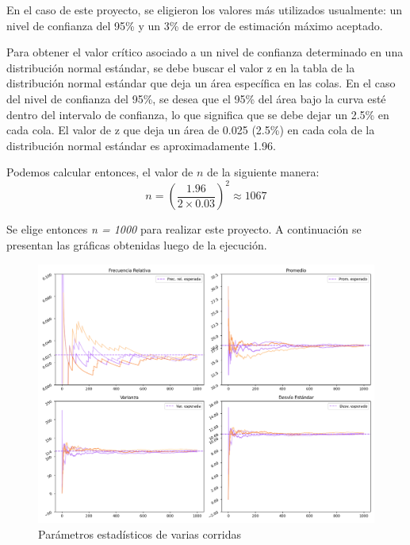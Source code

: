 \documentclass{article}
\begin{document}
\par En el caso de este proyecto, se eligieron los valores más utilizados usualmente: un nivel de confianza del 95\% y un 3\% de error de estimación máximo aceptado.
\par Para obtener el valor crítico asociado a un nivel de confianza determinado en una distribución normal estándar, se debe buscar el valor z en la tabla de la distribución normal estándar que deja un área específica en las colas. En el caso del nivel de confianza del 95\%, se desea que el 95\% del área bajo la curva esté dentro del intervalo de confianza, lo que significa que se debe dejar un 2.5\% en cada cola. El valor de z que deja un área de 0.025 (2.5\%) en cada cola de la distribución normal estándar es aproximadamente 1.96.
\par Podemos calcular entonces, el valor de $n$ de la siguiente manera:
\[ n = \left( \frac{1.96}{2 \times 0.03} \right)^2 \approx 1067 \]

\par Se elige entonces \textit{n = 1000} para realizar este proyecto. A continuación se presentan las gráficas obtenidas luego de la ejecución.

\begin{figure}[H]
    \centering
    \includegraphics[width=0.8\linewidth]{Imagenes/ParametrosTiradasTotales.png}
    \caption{Parámetros estadísticos de varias corridas}
    \label{fig:parametrosDeTiradas}
\end{figure}
\end{document}
